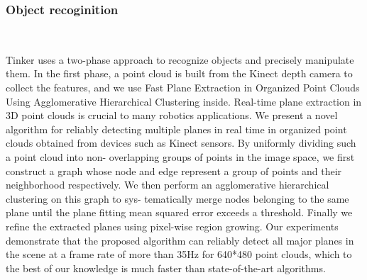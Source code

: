 \subsubsection{Object recoginition}
\ 

Tinker uses a two-phase approach to recognize objects and precisely manipulate them. In the first phase, a point cloud is built from the Kinect depth camera to collect the features, and we use Fast Plane Extraction in Organized Point Clouds Using Agglomerative Hierarchical Clustering inside.
Real-time plane extraction in 3D point clouds
is crucial to many robotics applications. We present a novel
algorithm for reliably detecting multiple planes in real time in
organized point clouds obtained from devices such as Kinect
sensors. By uniformly dividing such a point cloud into non-
overlapping groups of points in the image space, we first
construct a graph whose node and edge represent a group of
points and their neighborhood respectively. We then perform
an agglomerative hierarchical clustering on this graph to sys-
tematically merge nodes belonging to the same plane until the
plane fitting mean squared error exceeds a threshold. Finally
we refine the extracted planes using pixel-wise region growing.
Our experiments demonstrate that the proposed algorithm can
reliably detect all major planes in the scene at a frame rate of
more than 35Hz for 640*480 point clouds, which to the best of
our knowledge is much faster than state-of-the-art algorithms.

